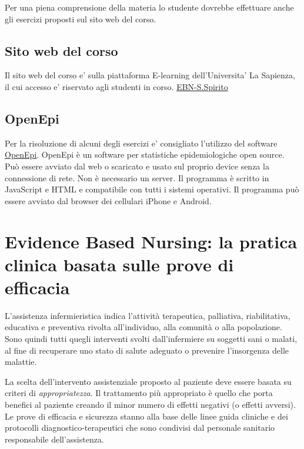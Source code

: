 \documentclass[]{book}
\begin{document}
Per una piena comprensione della materia lo studente dovrebbe effettuare anche gli esercizi proposti sul sito web del corso.

\hypertarget{sito-web-del-corso}{%
\section{Sito web del corso}\label{sito-web-del-corso}}

Il sito web del corso e' sulla piattaforma E-learning dell'Universita' La Sapienza, il cui accesso e' riservato agli studenti in corso. \href{https://elearning.uniroma1.it/course/view.php?id=3720}{EBN-S.Spirito}

\hypertarget{openepi}{%
\section{OpenEpi}\label{openepi}}

Per la risoluzione di alcuni degli esercizi e' consigliato l'utilizzo del software \href{http://www.openepi.com/Menu/OE_Menu.htm}{OpenEpi}. OpenEpi è un software per statistiche epidemiologiche open source. Può essere avviato dal web o scaricato e usato sul proprio device senza la connessione di rete. Non è necessario un server. Il programma è scritto in JavaScript e HTML e compatibile con tutti i sistemi operativi. Il programma può essere avviato dal browser dei cellulari iPhone e Android.

\hypertarget{evidence-based-nursing-la-pratica-clinica-basata-sulle-prove-di-efficacia}{%
\chapter{Evidence Based Nursing: la pratica clinica basata sulle prove di efficacia}\label{evidence-based-nursing-la-pratica-clinica-basata-sulle-prove-di-efficacia}}

L'assistenza infermieristica indica l'attività terapeutica, palliativa, riabilitativa, educativa e preventiva rivolta all'individuo, alla comunità o alla popolazione. Sono quindi tutti quegli interventi svolti dall'infermiere su soggetti sani o malati, al fine di recuperare uno stato di salute adeguato o prevenire l'insorgenza delle malattie.

La scelta dell'intervento assistenziale proposto al paziente deve essere basata su criteri di \emph{appropriatezza}. Il trattamento più appropriato è quello che porta benefici al paziente creando il minor numero di effetti negativi (o effetti avversi). Le prove di efficacia e sicurezza stanno alla base delle linee guida cliniche e dei protocolli diagnostico-terapeutici che sono condivisi dal personale sanitario responsabile dell'assistenza.
\end{document}
